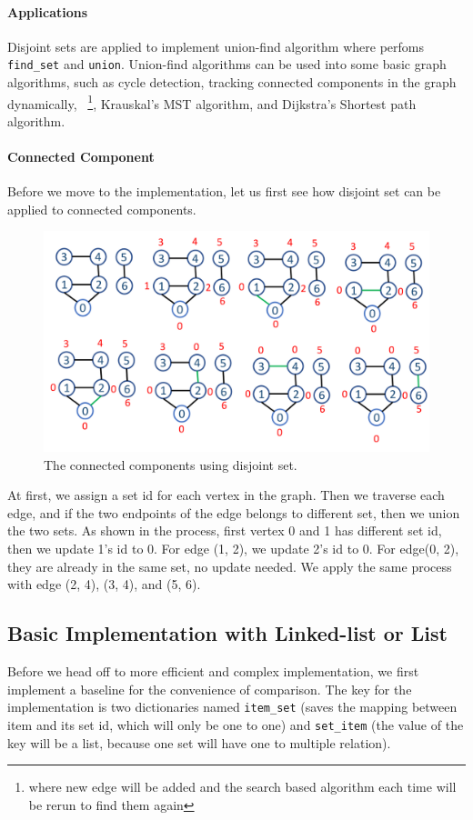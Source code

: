 \documentclass[../main.tex]{subfiles}
\begin{document}
\paragraph{Applications} Disjoint sets are applied to implement union-find algorithm where perfoms \texttt{find\_set} and \texttt{union}. Union-find algorithms can be used into some basic graph algorithms, such as cycle detection, tracking connected components in the graph dynamically,  ~\footnote{where new edge will be added and the search based algorithm each time will be rerun to find them again}, Krauskal's MST algorithm, and Dijkstra's Shortest path algorithm.

\paragraph{Connected Component} Before we move to the implementation, let us first see how disjoint set can be applied to connected components.
\begin{figure}[h]
    \centering
    \includegraphics[width=0.98\columnwidth] {fig/disjoint_set.png}
    \caption{The connected components using disjoint set.}
    \label{fig:cc_undirected_disjoint_set}
\end{figure}
At first, we assign a set id for each vertex in the graph. Then we traverse each edge, and if the two endpoints of the edge belongs to different set, then we union the two sets. As shown in the process, first vertex 0 and 1 has different set id, then we update 1's id to 0. For edge (1, 2), we update 2's id to 0. For edge(0, 2), they are already in the same set, no update needed. We apply the same process with edge (2, 4), (3, 4), and (5, 6). 

\subsection{Basic Implementation with Linked-list or List}
Before we head off to more efficient and complex implementation, we first implement a baseline for the convenience of comparison. The key for the implementation is two dictionaries named \texttt{item\_set} (saves the mapping between item and its set id, which will only be one to one) and \texttt{set\_item} (the value of the key will be a list, because one set will have one to multiple relation). 
\end{document}

